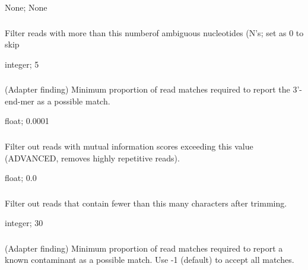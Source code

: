 \documentclass[letterpaper,11pt,english]{sphinxmanual}
\begin{document}
 None;  None


\subsubsection{}
\label{\detokenize{prog_desc:a-filter-ambig}}
 Filter reads with more than this numberof ambiguous nucleotides (N’s; set as 0 to skip

 integer;  5


\subsubsection{}
\label{\detokenize{prog_desc:e-adapter-end-min-match}}
 (Adapter finding) Minimum proportion of read matches required to report the 3’-end-mer as a possible match.

 float;  0.0001


\subsubsection{}
\label{\detokenize{prog_desc:i-filter-low-info}}
 Filter out reads with mutual information scores exceeding this value (ADVANCED, removes highly repetitive reads).

 float;  0.0


\subsubsection{}
\label{\detokenize{prog_desc:l-filter-length}}
 Filter out reads that contain fewer than this many characters after trimming.

 integer;  30


\subsubsection{}
\label{\detokenize{prog_desc:m-adapter-known-min-match}}
 (Adapter finding) Minimum proportion of read matches required to report a known contaminant as a possible match. Use -1 (default) to accept all matches.
\end{document}
